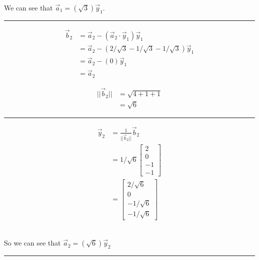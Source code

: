 \documentclass{report}
\begin{document}
We can see that $\vec{a}_1 = (\sqrt{3})\vec{y}_1$.
\vspace{0.5em}
\hrule
\vspace{0.5em}
\begin{minipage}{0.45\textwidth}
$$
\begin{aligned}
\vec{b}_2 &= \vec{a}_2 - (\vec{a}_2\cdot\vec{y}_1)\vec{y}_1\\
&=\vec{a}_2 - (2/\sqrt{3}-1/\sqrt{3}-1/\sqrt{3})\vec{y}_1\\
&=\vec{a}_2 - (0)\vec{y}_1\\
&=\vec{a}_2
\end{aligned}
$$
\end{minipage}
\begin{minipage}{0.45\textwidth}
$$
\begin{aligned}
||\vec{b}_2|| &= \sqrt{4 + 1 + 1}\\
&=\sqrt{6}
\end{aligned}
$$
\hrule
\vspace{0.5em}
$$
\begin{aligned}
\vec{y}_2&=\frac{1}{||\vec{b}_2||}\vec{b}_2\\
&=1/\sqrt{6}\begin{bmatrix}2\\0\\-1\\-1\end{bmatrix}\\
&=\begin{bmatrix}2/\sqrt{6}\\0\\-1/\sqrt{6}\\-1/\sqrt{6}\end{bmatrix}
\end{aligned}
$$
\end{minipage}\\
So we can see that $\vec{a}_2 = (\sqrt{6})\vec{y}_2$
\vspace{0.5em}
\hrule
\vspace{0.5em}
\end{document}
